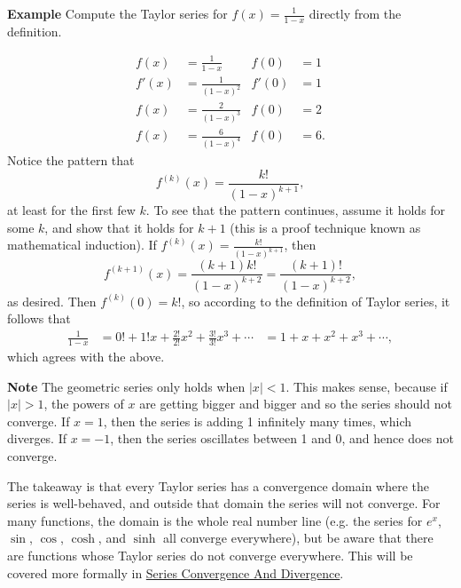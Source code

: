 \documentclass[twoside,openright,titlepage,a4paper]{book}
\begin{document}
\begin{sloppypar}
\textbf{Example} Compute the Taylor series for $f(x) = \frac{1}{1-x}$ directly from the definition.
\begin{examplebox}
\begin{align*} 
f(x) &= \frac{1}{1-x} & f(0) &= 1 \\
f'(x) &= \frac{1}{(1-x)^2} & f'(0) &= 1 \\
f(x) &= \frac{2}{(1-x)^3} & f(0) &= 2 \\
f(x) &= \frac{6}{(1-x)^4} & f(0) &=6. 
\end{align*}	
Notice the pattern that
\begin{equation*} 
f^{\left(k\right)}(x) = \frac{k!}{(1-x)^{k+1}}, 
\end{equation*}	
at least for the first few $k$. To see that the pattern continues, assume it holds for some $k$, and show that it holds for $k+1$ (this is a proof technique known as mathematical induction). If $f^{\left(k\right)}(x) = \frac{k!}{(1-x)^{k+1}}$, then
\begin{equation*}
f^{\left(k+1\right)}(x) = \frac{(k+1)k!}{(1-x)^{k+2}} = \frac{(k+1)!}{(1-x)^{k+2}}, 
\end{equation*}	
as desired. Then $f^{\left(k\right)}(0) = k!$, so according to the definition of Taylor series, it follows that	
\begin{align*} 
\frac{1}{1-x} &= 0! + 1!x+ \frac{2!}{2!}x^2+ \frac{3!}{3!}x^3+\dotsb
&= 1+x+x^2+x^3+\dotsb, 
\end{align*}
which agrees with the above.
\end{examplebox}

\textbf{Note} The geometric series only holds when $|x|<1$. This makes sense, because if $|x|>1$, the powers of $x$ are getting bigger and bigger and so the series should not converge. If $x=1$, then the series is adding 1 infinitely many times, which diverges. If $x=-1$, then the series oscillates between 1 and 0, and hence does not converge.

The takeaway is that every Taylor series has a convergence domain where the series is well-behaved, and outside that domain the series will not converge. For many functions, the domain is the whole real number line (e.g. the series for $e^x$, $\sin$, $\cos$, $\cosh$, and $\sinh$ all converge everywhere), but be aware that there are functions whose Taylor series do not converge everywhere. This will be covered more formally in \hyperref[ChSeriesConvergenceAndDivergence]{Series Convergence And Divergence}.


\end{sloppypar}
\end{document}
